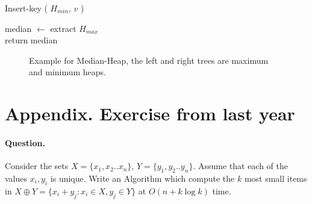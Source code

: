 \begin{algorithm}[H]  
 {
	 {
       Insert-key ( $H_{min}$, $v$ )
    }
}
\end{algorithm}



\begin{algorithm}[H]
median $\leftarrow$ extract $H_{max}$ \\   
return median 
\end{algorithm}


\begin{figure}[h]
  \centering
  \begin{subfigure}[b]{0.49\textwidth}
	
  \end{subfigure}
\begin{subfigure}[b]{0.49\textwidth}
	
  \end{subfigure}
  \caption{ Example for Median-Heap, the left and right trees are maximum and minimum heaps.  }
\end{figure}

\iffalse 
  \newpage

\section{ Appendix. Exercise from last year }

\paragraph{Question.} Consider the sets $X = \{x_1,x_2 .. x_n\}$, $Y = \{y_1, y_2 .. y_n\}$. Assume that each of the values $x_i,y_i$ is unique. Write an Algorithm which compute the $k$ most small items in $X \oplus Y = \{ x_{i} + y_{j} : x_{i} \in X , y_{j} \in Y  \} $ at $ O \left( n + k\log k  \right) $ time. 

